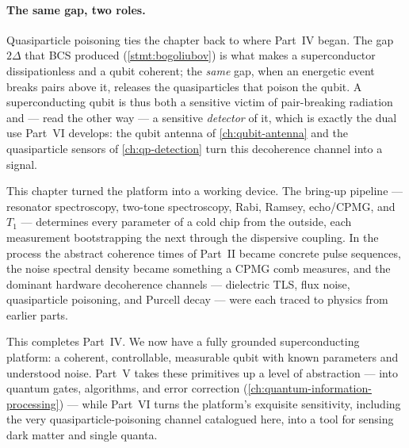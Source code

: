 \paragraph{The same gap, two roles.}
Quasiparticle poisoning ties the chapter back to where Part~IV began.
The gap $2\Delta$ that BCS produced (\cref{stmt:bogoliubov}) is what
makes a superconductor dissipationless and a qubit coherent; the
\emph{same} gap, when an energetic event breaks pairs above it, releases
the quasiparticles that poison the qubit. A superconducting qubit is
thus both a sensitive victim of pair-breaking radiation and --- read
the other way --- a sensitive \emph{detector} of it, which is exactly
the dual use Part~VI develops: the qubit antenna of
\cref{ch:qubit-antenna} and the quasiparticle sensors of
\cref{ch:qp-detection} turn this decoherence channel into a signal.

This chapter turned the platform into a working device. The bring-up
pipeline --- resonator spectroscopy, two-tone spectroscopy, Rabi,
Ramsey, echo/CPMG, and $T_1$ --- determines every parameter of a cold
chip from the outside, each measurement bootstrapping the next through
the dispersive coupling. In the process the abstract coherence times of
Part~II became concrete pulse sequences, the noise spectral density
became something a CPMG comb measures, and the dominant hardware
decoherence channels --- dielectric TLS, flux noise, quasiparticle
poisoning, and Purcell decay --- were each traced to physics from
earlier parts.

This completes Part~IV. We now have a fully grounded superconducting
platform: a coherent, controllable, measurable qubit with known
parameters and understood noise. Part~V takes these primitives up a
level of abstraction --- into quantum gates, algorithms, and error
correction (\cref{ch:quantum-information-processing}) --- while Part~VI
turns the platform's exquisite sensitivity, including the very
quasiparticle-poisoning channel catalogued here, into a tool for
sensing dark matter and single quanta.

